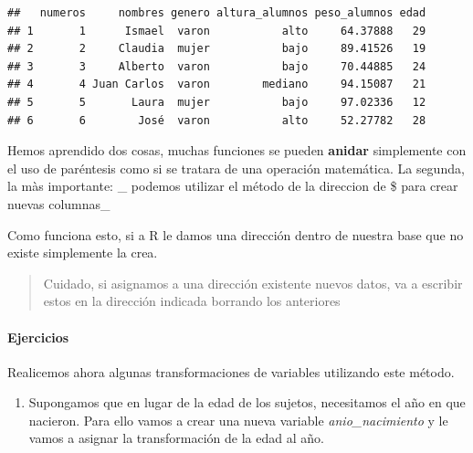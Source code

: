 \documentclass[
]{book}
\newenvironment{Shaded}{\begin{snugshade}}{\end{snugshade}}
\newcommand{\DecValTok}[1]{\textcolor[rgb]{0.00,0.00,0.81}{#1}}
\newcommand{\FunctionTok}[1]{\textcolor[rgb]{0.00,0.00,0.00}{#1}}
\newcommand{\NormalTok}[1]{#1}
\newcommand{\OtherTok}[1]{\textcolor[rgb]{0.56,0.35,0.01}{#1}}
\newcommand{\SpecialCharTok}[1]{\textcolor[rgb]{0.00,0.00,0.00}{#1}}
\providecommand{\tightlist}{%
  \setlength{\itemsep}{0pt}\setlength{\parskip}{0pt}}
\begin{document}
\begin{verbatim}
##   numeros     nombres genero altura_alumnos peso_alumnos edad
## 1       1      Ismael  varon           alto     64.37888   29
## 2       2     Claudia  mujer           bajo     89.41526   19
## 3       3     Alberto  varon           bajo     70.44885   24
## 4       4 Juan Carlos  varon        mediano     94.15087   21
## 5       5       Laura  mujer           bajo     97.02336   12
## 6       6        José  varon           alto     52.27782   28
\end{verbatim}

Hemos aprendido dos cosas, muchas funciones se pueden \textbf{anidar} simplemente con el uso de paréntesis como si se tratara de una operación matemática.
La segunda, la màs importante: \_ podemos utilizar el método de la direccion de \$ para crear nuevas columnas\_

Como funciona esto, si a R le damos una dirección dentro de nuestra base que no existe simplemente la crea.

\begin{quote}
Cuidado, si asignamos a una dirección existente nuevos datos, va a escribir estos en la dirección indicada borrando los anteriores
\end{quote}

\hypertarget{ejercicios-1}{%
\paragraph{\texorpdfstring{ Ejercicios}{ Ejercicios}}\label{ejercicios-1}}

Realicemos ahora algunas transformaciones de variables utilizando este método.

\begin{enumerate}
\def\labelenumi{\arabic{enumi}.}
\tightlist
\item
  Supongamos que en lugar de la edad de los sujetos, necesitamos el año en que nacieron. Para ello vamos a crear una nueva variable \emph{anio\_nacimiento} y le vamos a asignar la transformación de la edad al año.
\end{enumerate}

\begin{Shaded}
\end{Shaded}
\end{document}
